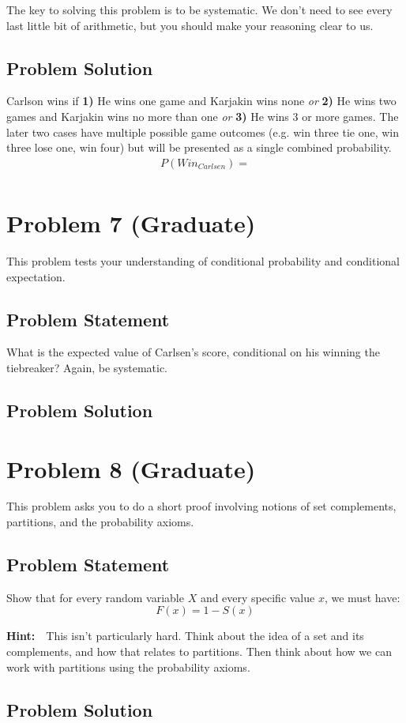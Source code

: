 \documentclass[12pt]{article}
\theoremstyle{definition}
\begin{document}
\bigskip
The key to solving this problem is to be systematic. We don't need to see every last little bit of arithmetic, but you should make your reasoning clear to us.


\subsection*{Problem Solution}
Carlson wins if \textbf{1)} He wins one game and Karjakin wins none \textit{or} \textbf{2)} He wins two games and Karjakin wins no more than one \textit{or} \textbf{3)} He wins 3 or more games. The later two cases have multiple possible game outcomes (e.g. win three tie one, win three lose one, win four) but will be presented as a single combined probability.
\begin{align*}
P(Win_{Carlsen}) = \\
\end{align*}



\newpage
\section*{Problem 7 (Graduate)}

This problem tests your understanding of conditional probability and conditional expectation.

\subsection*{Problem Statement}

What is the expected value of Carlsen's score, conditional on his winning the tiebreaker? Again, be systematic.

\subsection*{Problem Solution}





\newpage
\section*{Problem 8 (Graduate)}

This problem asks you to do a short proof involving notions of set complements, partitions, and the probability axioms.

\subsection*{Problem Statement}

Show that for every random variable $X$ and every specific value $x$, we must have:
$$
F(x) = 1 - S(x)
$$

\bigskip
\noindent
{\bf Hint:}\ \ This isn't particularly hard. Think about the idea of a set and its complements, and how that relates to partitions. Then think about how we can work with partitions using the probability axioms.



\subsection*{Problem Solution}
\end{document}
